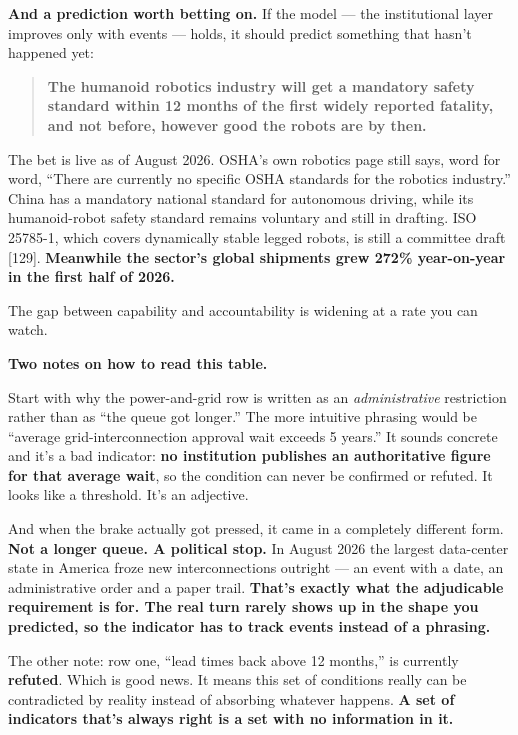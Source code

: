 \documentclass[11pt,a4paper]{article}
\begin{document}
\textbf{And a prediction worth betting on.} If the model --- the institutional layer improves only with events --- holds, it should predict something that hasn't happened yet:

\begin{quote}
\textbf{The humanoid robotics industry will get a mandatory safety standard within 12 months of the first widely reported fatality, and not before, however good the robots are by then.}
\end{quote}

The bet is live as of August 2026. OSHA's own robotics page still says, word for word, ``There are currently no specific OSHA standards for the robotics industry.'' China has a mandatory national standard for autonomous driving, while its humanoid-robot safety standard remains voluntary and still in drafting. ISO 25785-1, which covers dynamically stable legged robots, is still a committee draft [129]. \textbf{Meanwhile the sector's global shipments grew 272\% year-on-year in the first half of 2026.}

The gap between capability and accountability is widening at a rate you can watch.

\textbf{Two notes on how to read this table.}

Start with why the power-and-grid row is written as an \textit{administrative} restriction rather than as ``the queue got longer.'' The more intuitive phrasing would be ``average grid-interconnection approval wait exceeds 5 years.'' It sounds concrete and it's a bad indicator: \textbf{no institution publishes an authoritative figure for that average wait}, so the condition can never be confirmed or refuted. It looks like a threshold. It's an adjective.

And when the brake actually got pressed, it came in a completely different form. \textbf{Not a longer queue. A political stop.} In August 2026 the largest data-center state in America froze new interconnections outright --- an event with a date, an administrative order and a paper trail. \textbf{That's exactly what the adjudicable requirement is for. The real turn rarely shows up in the shape you predicted, so the indicator has to track events instead of a phrasing.}

The other note: row one, ``lead times back above 12 months,'' is currently \textbf{refuted}. Which is good news. It means this set of conditions really can be contradicted by reality instead of absorbing whatever happens. \textbf{A set of indicators that's always right is a set with no information in it.}
\end{document}
